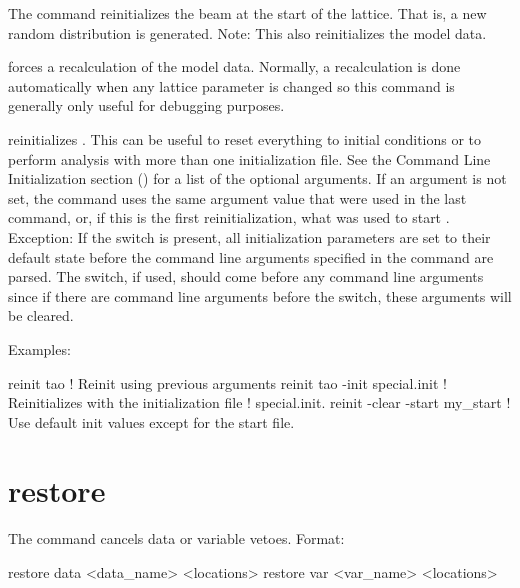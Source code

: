 \vskip 10pt 

The  command reinitializes the beam at the start of the lattice. That is, a
new random distribution is generated.  Note: This also reinitializes the model data.

 forces a recalculation of the model data.  Normally, a recalculation is done
automatically when any lattice parameter is changed so this command is generally only useful for
debugging purposes.

 reinitializes \tao. This can be useful to reset everything to initial
conditions or to perform analysis with more than one initialization file. See the Command Line
Initialization section () for a list of the optional arguments. If an argument
is not set, the  command uses the same argument value that were used in the last
 command, or, if this is the first reinitialization, what was used to start \tao.
Exception: If the  switch is present, all initialization parameters are set to their
default state before the command line arguments specified in the  command are
parsed. The  switch, if used, should come before any command line arguments since if
there are command line arguments before the  switch, these arguments will be cleared.

Examples:
\begin{example}
  reinit tao                         ! Reinit using previous arguments
  reinit tao -init special.init      ! Reinitializes \tao with the initialization file 
                                     !   special.init.
  reinit -clear -start my_start      ! Use default init values except for the start file.                    
\end{example}

\section{restore}
\label{s:restore}

The  command cancels data or variable vetoes. Format:
\begin{example}
  restore data  <data_name> <locations>
  restore var <var_name> <locations>
\end{example}

\vskip 10pt 

